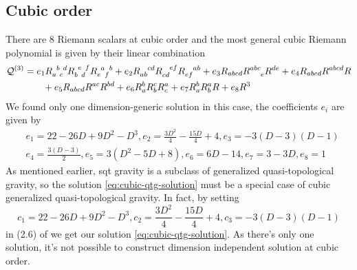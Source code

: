 \documentclass[a4paper,11pt]{article}
\begin{document}
\subsection{Cubic order}
There are 8 Riemann scalars at cubic order and the most general cubic Riemann polynomial is given by their linear combination
\begin{align}
    \mathcal Q^{(3)} & = 
    e_1 R\indices{_a^b_c^d} R\indices{_b^e_d^f} R\indices{_e^a_f^b}
    + e_2 R\indices{_a_b^c^d} R\indices{_c_d^e^f} R\indices{_e_f^a^b}
    + e_3 R_{abcd}R\indices{^a^b^c_e} R^{de}
    + e_4 R_{abcd} R^{abcd} R\nonumber\\
    & \qquad + e_5 R_{abcd} R^{ac} R^{bd}
    + e_6 R_a^b R_b^c R_c^a
    + e_7 R_a^b R_b^a R
    + e_8 R^3
\end{align}
We found only one dimension-generic solution in this case, the coefficients $e_i$ are given by
\begin{align}\label{eq:cubic-qtg-solution}
    & e_1 = 22 - 26 D + 9 D^2 - D^3, e_2 = \frac{3 D^2}{4}-\frac{15 D}{4} + 4, e_3 = -3 (D-3) (D-1)\nonumber\\
    & e_4 = \frac{3 (D-3)}{2}, e_5 = 3 \left(D^2-5 D+8\right), e_6 = 6 D-14, e_7 = 3 - 3D, e_8 = 1
\end{align}
As mentioned earlier, \ac{sqt} gravity is a subclass of generalized quasi-topological gravity, so the solution \eqref{eq:cubic-qtg-solution} must be a special case of cubic generalized quasi-topological gravity. In fact, by setting
\begin{equation*}
    c_1 = 22 - 26 D + 9 D^2 - D^3, c_2 = \frac{3 D^2}{4}-\frac{15 D}{4} + 4, c_3 = -3 (D-3) (D-1)
\end{equation*}
in (2.6) of \cite{cubic-gqtg} we get our solution \eqref{eq:cubic-qtg-solution}. As there's only one solution, it's not possible to construct dimension independent solution at cubic order.
\end{document}
